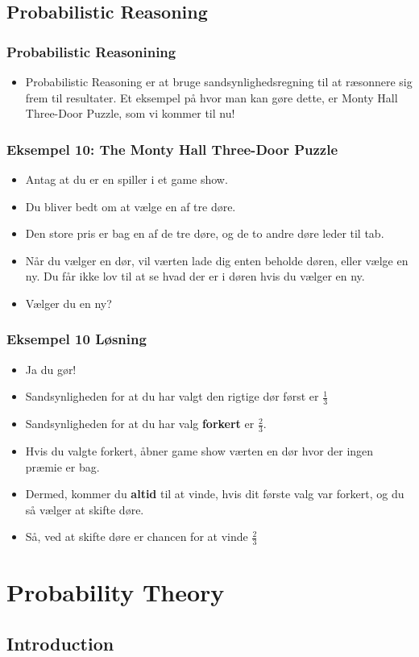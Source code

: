 \documentclass{beamer}
\begin{document}
\subsection{Probabilistic Reasoning}
\label{subsec:probabilistic-reasoning}

\begin{frame}
  \frametitle{Probabilistic Reasonining}
 \begin{itemize}
 \item Probabilistic Reasoning er at bruge sandsynlighedsregning til at ræsonnere sig frem til resultater. Et eksempel på hvor man kan gøre dette, er Monty Hall Three-Door Puzzle, som vi kommer til nu!
 \end{itemize} 
\end{frame}

\begin{frame}
  \frametitle{Eksempel 10: The Monty Hall Three-Door Puzzle}
  \begin{itemize}
  \item Antag at du er en spiller i et game show.
  \item Du bliver bedt om at vælge en af tre døre.
  \item Den store pris er bag en af de tre døre, og de to andre døre leder til tab.
  \item Når du vælger en dør, vil værten lade dig enten beholde døren, eller vælge en ny. Du får ikke lov til at se hvad der er i døren hvis du vælger en ny.
  \item Vælger du en ny? 
  \end{itemize}
\end{frame}

\begin{frame}
  \frametitle{Eksempel 10 Løsning}
  
  \begin{itemize}
  \item Ja du gør!
  \item Sandsynligheden for at du har valgt den rigtige dør først er $\frac{1}{3}$
  \item Sandsynligheden for at du har valg \textbf{forkert} er $\frac{2}{3}$. 
  \item Hvis du valgte forkert, åbner game show værten en dør hvor der ingen præmie er bag.
  \item Dermed, kommer du \textbf{altid} til at vinde, hvis dit første valg var forkert, og du så vælger at skifte døre.
  \item Så, ved at skifte døre er chancen for at vinde $\frac{2}{3}$
  \end{itemize}
\end{frame}

\section{Probability Theory}
\label{sec:probability-theortheory}

\subsection{Introduction}
\label{subsec:probability-theory-introduction}
\end{document}
